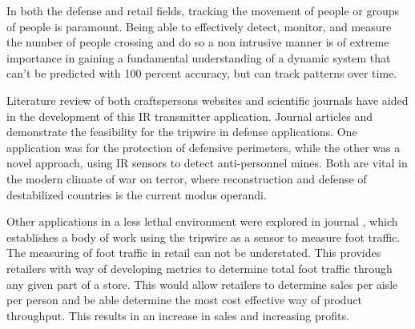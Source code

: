 



In both the defense and retail fields, tracking the movement of people or groups of people is paramount. Being able to effectively detect, monitor, and measure the number of people crossing and do so a non intrusive manner is of extreme importance in gaining a fundamental understanding of a dynamic system that can't be predicted with 100 percent accuracy, but can track patterns over time.
 
 Literature review of both craftspersons websites and scientific journals have aided in the development of this IR transmitter application. Journal articles \cite{b1} and \cite{b2} demonstrate the feasibility for the tripwire in defense applications. One application was for the protection of defensive perimeters, while the other was a novel approach, using IR sensors to detect anti-personnel mines. Both are vital in the modern climate of war on terror, where reconstruction and defense of destabilized countries is the current modus operandi. 

Other applications in a less lethal environment were explored in journal \cite{b3}, which establishes a body of work using the tripwire as a sensor to measure foot traffic. The measuring of foot traffic in retail can not be understated. This provides retailers with way of developing metrics to determine total foot traffic through any given part of a store. This would allow retailers to determine sales per aisle per person and be able determine the most cost effective way of product throughput. This results in an increase in sales and increasing profits.
	






